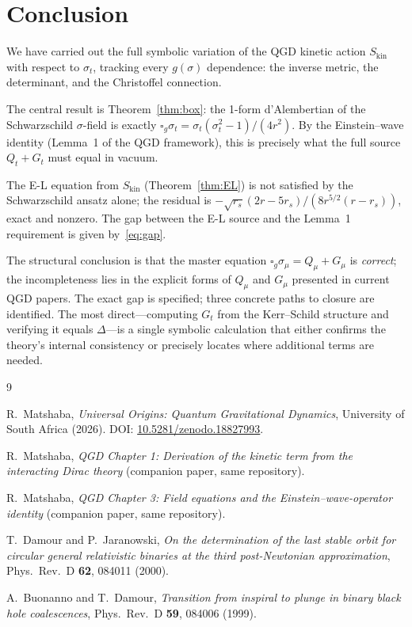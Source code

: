 \documentclass[11pt,a4paper]{article}
\theoremstyle{plain}
\theoremstyle{definition}
\newcommand{\sig}{\sigma}
\newcommand{\sigt}{\sigma_t}
\newcommand{\rs}{r_s}
\newcommand{\boxg}{\square_g}
\newcommand{\Skin}{S_{\mathrm{kin}}}
\begin{document}
\section{Conclusion}

We have carried out the full symbolic variation of the QGD kinetic
action $\Skin$ with respect to $\sigt$, tracking every $g(\sig)$
dependence: the inverse metric, the determinant, and the Christoffel
connection.

The central result is Theorem~\ref{thm:box}: the 1-form d'Alembertian
of the Schwarzschild $\sig$-field is exactly
$\boxg\sigt = \sigt(\sigt^2-1)/(4r^2)$.  By the Einstein--wave
identity (Lemma~1 of the QGD framework), this is precisely what
the full source $Q_t + G_t$ must equal in vacuum.

The E-L equation from $\Skin$ (Theorem~\ref{thm:EL}) is not
satisfied by the Schwarzschild ansatz alone; the residual is
$-\sqrt{\rs}(2r-5\rs)/(8r^{5/2}(r-\rs))$, exact and nonzero.
The gap between the E-L source and the Lemma~1 requirement is
given by~\eqref{eq:gap}.

The structural conclusion is that the master equation
$\boxg\sig_\mu = Q_\mu + G_\mu$ is \emph{correct}; the
incompleteness lies in the explicit forms of $Q_\mu$ and $G_\mu$
presented in current QGD papers.  The exact gap is specified;
three concrete paths to closure are identified.  The most
direct---computing $G_t$ from the Kerr--Schild structure and
verifying it equals $\Delta$---is a single symbolic calculation
that either confirms the theory's internal consistency or
precisely locates where additional terms are needed.

\begin{thebibliography}{9}

R.~Matshaba, \textit{Universal Origins: Quantum Gravitational Dynamics},
University of South Africa (2026).
DOI: \href{https://doi.org/10.5281/zenodo.18827993}{10.5281/zenodo.18827993}.

R.~Matshaba, \textit{QGD Chapter 1: Derivation of the kinetic term from
the interacting Dirac theory} (companion paper, same repository).

R.~Matshaba, \textit{QGD Chapter 3: Field equations and the
Einstein--wave-operator identity} (companion paper, same repository).

T.~Damour and P.~Jaranowski,
\textit{On the determination of the last stable orbit for circular general
relativistic binaries at the third post-Newtonian approximation},
Phys.\ Rev.\ D \textbf{62}, 084011 (2000).

A.~Buonanno and T.~Damour,
\textit{Transition from inspiral to plunge in binary black hole coalescences},
Phys.\ Rev.\ D \textbf{59}, 084006 (1999).

\end{thebibliography}
\end{document}
